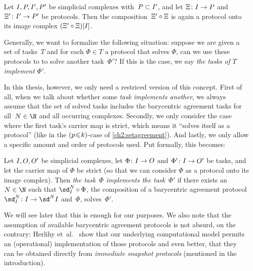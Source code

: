 \begin{thCorollary}
    Let $\cI,\cP,\cI',\cP'$ be simplicial complexes with~$\cP\subset\cI'$,
    and let $\Xi\colon\cI\to\cP$ and $\Xi'\colon\cI'\to\cP'$ be protocols.
    Then the composition~$\Xi'\after\Xi$ is again
    a protocol onto its image complex $(\Xi'\after\Xi)[\cI]$.
\end{thCorollary}

Generally, we want to formalize the following situation: suppose we are
given a set of tasks~$T$ and for each $\Phi\in T$ a protocol that
solves $\Phi$, can we use these protocols to to solve another task~$\Phi'$? If
this is the case, we say \emph{the tasks of $T$ implement $\Phi'$}.

In this thesis, however, we only need a restriced version of this concept.
First of all, when we talk about whether some \emph{task implements another},
we always assume that the set of solved tasks includes the barycentric agreement
tasks  for all~$N\in\N$ and all occurring
complexes. Secondly, we only consider the case where the first task's carrier map
is strict, which means it \enquote{solves itself as a protocol} (like in the
$(p\mkern1mu{\leq}\mkern1muk)$-case of \cref{ch2:setagreement}). And lastly, we
only allow a specific amount and order of protocols used. Put formally, this
becomes:

\begin{thDef}
    Let $\cI,\cO,\cO'$ be simplicial complexes, let
    $\Phi\colon\cI\to\cO$ and $\Phi'\colon\cI\to\cO'$ be tasks, and
    let the carrier map of $\Phi$ be strict (so that we can consider $\Phi$ as a
    protocol onto its image complex). Then \emph{the task~$\Phi$ implements the
    task~$\Phi'$} if there exists an $N\in\N$ such that $\sd_{\cI}^N\after\Phi$,
    the composition of a barycentric agreement protocol
    $\sd_{\cI}^N\colon\cI\to\sd^N\cI$ and~$\Phi$, solves~$\Phi'$.
\end{thDef}

We will see later that this is enough for our purposes. We also note that the
assumption of available barycentric agreement protocols is not absurd, on
the contrary: Herlihy et~al.~\cite[Corollary 4.2.10]{bookc:herlihyetal13} show
that our underlying computational model permits an (operational) implementation
of those protocols and even better, that they can be obtained directly from 
\emph{immediate snapshot protocols} (mentioned in the introduction).
